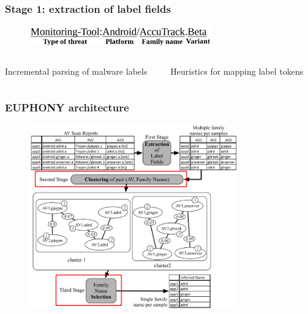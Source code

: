 \begin{frame}
    \frametitle{Stage 1: extraction of label fields}
    \centering
    \begin{figure}[!ht]
        \includegraphics[width=0.7\textwidth]{figures/euphony/label.pdf}
    \end{figure}

    \vspace{-20pt}

    \begin{columns}
        \begin{column}{0.6\textwidth}
            \begin{algorithm}[H]
                \tiny
                
                \caption{\footnotesize{Incremental parsing of malware labels}}
            \end{algorithm}
        \end{column}

        \begin{column}{0.5\textwidth}
            \vspace{10pt}
            \begin{table}[!ht]
                \caption{\footnotesize{Heuristics for mapping label tokens}}
                \vspace{-15pt}
                \resizebox{\textwidth}{!}{
                    
                }
            \end{table}
        \end{column}
    \end{columns}

\end{frame}

\begin{frame}
    \frametitle{EUPHONY architecture}

    \begin{figure}
        \vspace{-5pt}
        \includegraphics[width=0.8\textwidth]{figures/euphony/architecture-second.pdf}
    \end{figure}

\end{frame}

